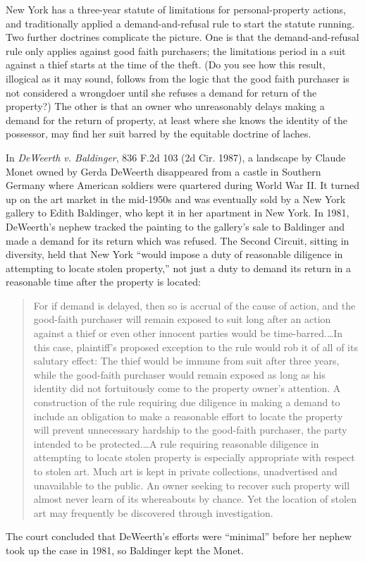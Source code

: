 

New York has a three-year statute of limitations
for personal-property actions, and traditionally applied a demand-and-refusal
rule to start the statute running. Two further doctrines complicate the
picture. One is that the demand-and-refusal rule only applies against
good faith purchasers; the limitations period in a suit against a thief starts
at the time of the theft. (Do you see how this result, illogical as it may
sound, follows from the logic that the good faith purchaser is not
considered a wrongdoer until she refuses a demand for return of the property?)
The other is that an owner who unreasonably delays making a demand for the
return of property, at least where she knows the identity of the possessor, may
find her suit barred by the equitable doctrine of laches.

In \textit{DeWeerth v. Baldinger}, 836 F.2d 103 (2d Cir. 1987), a landscape by
Claude Monet owned by Gerda DeWeerth disappeared from a castle in Southern
Germany where American soldiers were quartered during World War II. It turned
up on the art market in the mid-1950s and was eventually sold by a New York
gallery to Edith Baldinger, who kept it in her apartment in New York. In 1981,
DeWeerth's nephew tracked the painting to the gallery's sale to Baldinger and
made a demand for its return which was refused. The Second Circuit, sitting in
diversity, held that New York ``would impose a duty of reasonable diligence in
attempting to locate stolen property,'' not just a duty to demand its return in
a reasonable time after the property is located:
\begin{quote}
For if demand is delayed, then so is accrual of the cause of action, and the
good-faith purchaser will remain exposed to suit long after an action against a
thief or even other innocent parties would be time-barred.\ldots In this
case, plaintiff's proposed exception to the rule would rob it of all of its
salutary effect: The thief would be immune from suit after three years, while
the good-faith purchaser would remain exposed as long as his identity did not
fortuitously come to the property owner's attention. A construction of the rule
requiring due diligence in making a demand to include an obligation to make a
reasonable effort to locate the property will prevent unnecessary hardship to
the good-faith purchaser, the party intended to be protected.\ldots A rule
requiring reasonable diligence in attempting to locate stolen property is
especially appropriate with respect to stolen art. Much art is kept in private
collections, unadvertised and unavailable to the public. An owner seeking to
recover such property will almost never learn of its whereabouts by chance. Yet
the location of stolen art may frequently be discovered through investigation.
\end{quote}
The court concluded that DeWeerth's efforts were ``minimal'' before her nephew
took up the case in 1981, so Baldinger kept the Monet.

